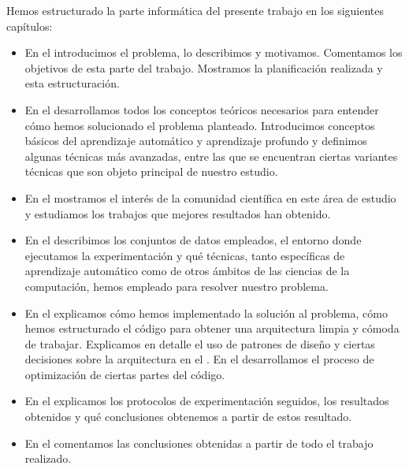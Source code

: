 Hemos estructurado la parte informática del presente trabajo en los siguientes capítulos:

\begin{itemize}
	\item En el  introducimos el problema, lo describimos y motivamos. Comentamos los objetivos de esta parte del trabajo. Mostramos la planificación realizada y esta estructuración.
	\item En el  desarrollamos todos los conceptos teóricos necesarios para entender cómo hemos solucionado el problema planteado. Introducimos conceptos básicos del aprendizaje automático y aprendizaje profundo y definimos algunas técnicas más avanzadas, entre las que se encuentran ciertas variantes técnicas que son objeto principal de nuestro estudio.
	\item En el  mostramos el interés de la comunidad científica en este área de estudio y estudiamos los trabajos que mejores resultados han obtenido.
	\item En el  describimos los conjuntos de datos empleados, el entorno donde ejecutamos la experimentación y qué técnicas, tanto específicas de aprendizaje automático como de otros ámbitos de las ciencias de la computación, hemos empleado para resolver nuestro problema.
	\item En el  explicamos cómo hemos implementado la solución al problema, cómo hemos estructurado el código para obtener una arquitectura limpia y cómoda de trabajar. Explicamos en detalle el uso de patrones de diseño y ciertas decisiones sobre la arquitectura en el . En el  desarrollamos el proceso de optimización de ciertas partes del código.
	\item En el  explicamos los protocolos de experimentación seguidos, los resultados obtenidos y qué conclusiones obtenemos a partir de estos resultado.
	\item En el  comentamos las conclusiones obtenidas a partir de todo el trabajo realizado.

\end{itemize}
